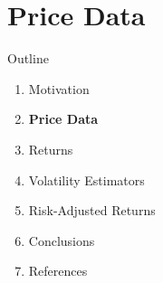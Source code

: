 \documentclass[9pt, aspectratio=169, t]{beamer}
\theoremstyle{definition}
\begin{document}
\section{Price Data}

\begin{frame}{Outline}

\begin{enumerate}
    \item Motivation \checkmark
    \item \textbf{Price Data}
    \item Returns
    \item Volatility Estimators
    \item Risk-Adjusted Returns
    \item Conclusions
    \item References
\end{enumerate}

\end{frame}
\end{document}
